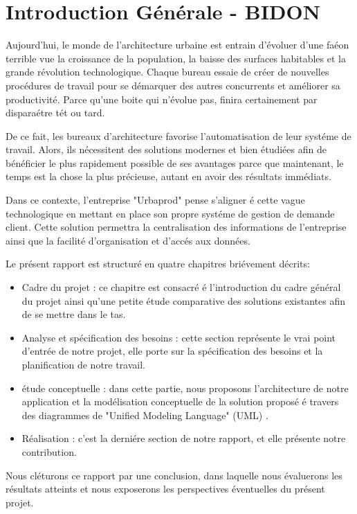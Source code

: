 \chapter*{Introduction Générale - BIDON}
\begin{spacing}{1.5}

Aujourd'hui, le monde de l'architecture urbaine est entrain d'évoluer d'une faéon terrible vue la croissance de la population, la baisse des surfaces habitables et la grande révolution technologique.
Chaque bureau essaie de créer de nouvelles procédures de travail pour se démarquer des autres concurrents et améliorer sa productivité. Parce qu'une boite qui n'évolue pas, finira certainement par disparaétre tét ou tard.

De ce fait, les bureaux d'architecture favorise l'automatisation de leur systéme de travail. Alors, ils nécessitent des solutions modernes et bien étudiées afin de bénéficier le plus rapidement possible de ses avantages parce que maintenant, le temps est la chose la plus précieuse, autant en avoir des résultats immédiats.

Dans ce contexte, l'entreprise "Urbaprod" pense s'aligner é cette vague technologique en mettant en place son propre systéme de gestion de demande client. Cette solution permettra la centralisation des informations de l'entreprise ainsi que la facilité d'organisation et d'accés aux données.

Le présent rapport est structuré en quatre chapitres briévement décrits:
\begin{itemize}
  \item Cadre du projet : ce chapitre est consacré é l'introduction du cadre général du projet ainsi qu'une petite étude comparative des solutions existantes afin de se mettre dans le tas.
  \item Analyse et spécification des besoins : cette section représente le vrai point d'entrée de notre projet, elle porte sur la spécification des besoins et la planification de notre travail.
  \item étude conceptuelle : dans cette partie, nous proposons l'architecture de notre application et la modélisation conceptuelle de la solution proposé é travers des diagrammes de "Unified Modeling Language" (UML) \cite{UML}.
  \item Réalisation : c'est la derniére section de notre rapport, et elle présente notre contribution.
\end{itemize}

Nous cléturons ce rapport par une conclusion, dans laquelle nous évaluerons les résultats atteints et nous exposerons les perspectives éventuelles du présent projet.



\end{spacing}


